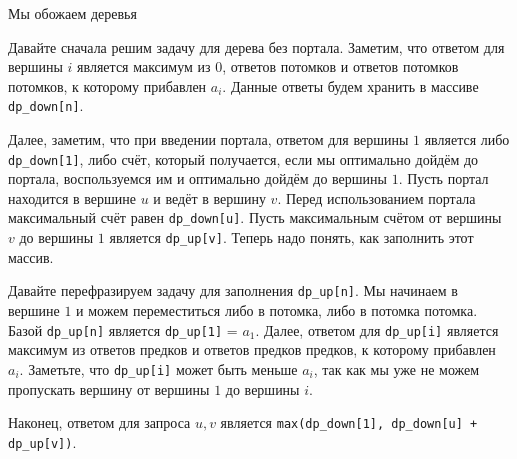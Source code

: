 \begin{tutorial}{Мы обожаем деревья}

Давайте сначала решим задачу для дерева без портала. Заметим, что ответом для вершины $i$ является максимум из $0$, ответов потомков и ответов потомков потомков, к которому прибавлен $a_i$. Данные ответы будем хранить в массиве \texttt{dp\_down[n]}.

Далее, заметим, что при введении портала, ответом для вершины $1$ является либо \texttt{dp\_down[1]}, либо счёт, который получается, если мы оптимально дойдём до портала, воспользуемся им и оптимально дойдём до вершины $1$. Пусть портал находится в вершине $u$ и ведёт в вершину $v$. Перед использованием портала максимальный счёт равен \texttt{dp\_down[u]}. Пусть максимальным счётом от вершины $v$ до вершины $1$ является \texttt{dp\_up[v]}. Теперь надо понять, как заполнить этот массив.

Давайте перефразируем задачу для заполнения \texttt{dp\_up[n]}. Мы начинаем в вершине $1$ и можем переместиться либо в потомка, либо в потомка потомка. Базой \texttt{dp\_up[n]} является \texttt{dp\_up[1]} = $a_1$. Далее, ответом для \texttt{dp\_up[i]} является максимум из ответов предков и ответов предков предков, к которому прибавлен $a_i$. Заметьте, что \texttt{dp\_up[i]} может быть меньше $a_i$, так как мы уже не можем пропускать вершину от вершины $1$ до вершины $i$.

Наконец, ответом для запроса $u,v$ является \texttt{max(dp\_down[1], dp\_down[u] + dp\_up[v])}.

\end{tutorial}
